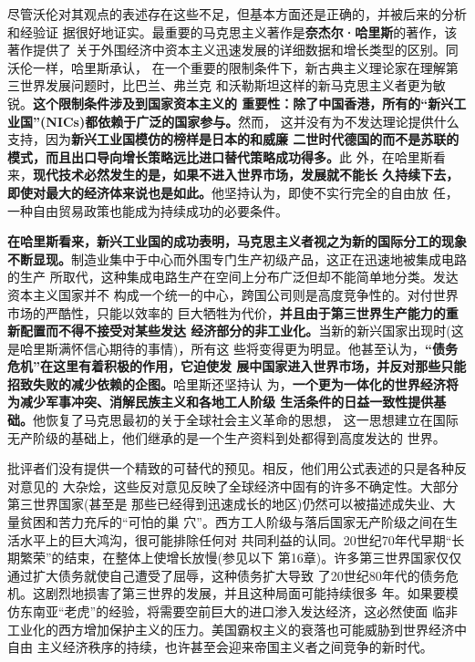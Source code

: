 尽管沃伦对其观点的表述存在这些不足，但基本方面还是正确的，并被后来的分析和经验证
据很好地证实。最重要的马克思主义著作是\textbf{奈杰尔·哈里斯}的著作，该著作提供了
关于外围经济中资本主义迅速发展的详细数据和增长类型的区别。同沃伦一样，哈里斯承认，
在一个重要的限制条件下，新古典主义理论家在理解第三世界发展问题时，比巴兰、弗兰克
和沃勒斯坦这样的新马克思主义者更为敏锐。\textbf{这个限制条件涉及到国家资本主义的
  重要性：除了中国香港，所有的“新兴工业国”(NICs)都依赖于广泛的国家参与。}然而，
这并没有为不发达理论提供什么支持，因为\textbf{新兴工业国模仿的榜样是日本的和威廉
  二世时代德国的而不是苏联的模式，而且出口导向增长策略远比进口替代策略成功得多。}此
外，在哈里斯看来，\textbf{现代技术必然发生的是，如果不进入世界市场，发展就不能长
  久持续下去，即使对最大的经济体来说也是如此。}他坚持认为，即使不实行完全的自由放
任，一种自由贸易政策也能成为持续成功的必要条件。

\textbf{在哈里斯看来，新兴工业国的成功表明，马克思主义者视之为新的国际分工的现象
  不断显现。}制造业集中于中心而外围专门生产初级产品，这正在迅速地被集成电路的生产
所取代，这种集成电路生产在空间上分布广泛但却不能简单地分类。发达资本主义国家并不
构成一个统一的中心，跨国公司则是高度竞争性的。对付世界市场的严酷性，只能以效率的
巨大牺牲为代价，\textbf{并且由于第三世界生产能力的重新配置而不得不接受对某些发达
  经济部分的非工业化。}当新的新兴国家出现时(这是哈里斯满怀信心期待的事情)，所有这
些将变得更为明显。他甚至认为，\textbf{“债务危机”在这里有着积极的作用，它迫使发
  展中国家进入世界市场，并反对那些只能招致失败的减少依赖的企图。}哈里斯还坚持认
为，\textbf{一个更为一体化的世界经济将为减少军事冲突、消解民族主义和各地工人阶级
  生活条件的日益一致性提供基础。}他恢复了马克思最初的关于全球社会主义革命的思想，
这一思想建立在国际无产阶级的基础上，他们继承的是一个生产资料到处都得到高度发达的
世界。

批评者们没有提供一个精致的可替代的预见。相反，他们用公式表述的只是各种反对意见的
大杂烩，这些反对意见反映了全球经济中固有的许多不确定性。大部分第三世界国家(甚至是
那些已经得到迅速成长的地区)仍然可以被描述成失业、大量贫困和苦力充斥的“可怕的巢
穴”。西方工人阶级与落后国家无产阶级之间在生活水平上的巨大鸿沟，很可能排除任何对
共同利益的认同。20世纪70年代早期“长期繁荣”的结束，在整体上使增长放慢(参见以下
第16章)。许多第三世界国家仅仅通过扩大债务就使自己遭受了屈辱，这种债务扩大导致
了20世纪80年代的债务危机。这剧烈地损害了第三世界的发展，并且这种局面可能持续很多
年。如果要模仿东南亚“老虎”的经验，将需要空前巨大的进口渗入发达经济，这必然使面
临非工业化的西方增加保护主义的压力。美国霸权主义的衰落也可能威胁到世界经济中自由
主义经济秩序的持续，也许甚至会迎来帝国主义者之间竞争的新时代。

